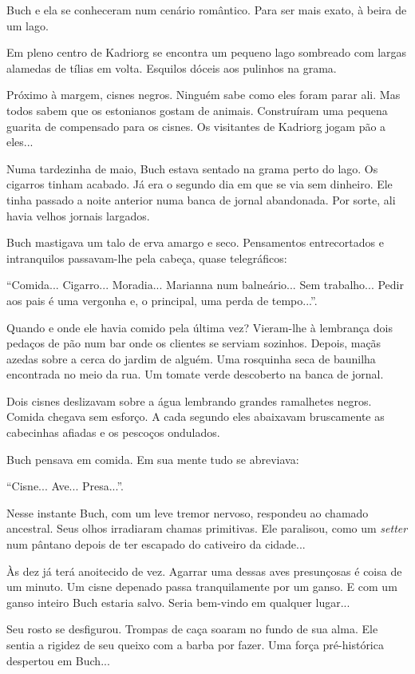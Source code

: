 Buch e ela se conheceram num cenário romântico. Para ser mais exato, à
beira de um lago.

Em pleno centro de Kadriorg se encontra um pequeno lago sombreado com
largas alamedas de tílias em volta. Esquilos dóceis aos pulinhos na
grama.

Próximo à margem, cisnes negros. Ninguém sabe como eles foram parar ali.
Mas todos sabem que os estonianos gostam de animais. Construíram uma
pequena guarita de compensado para os cisnes. Os visitantes de Kadriorg
jogam pão a eles...

Numa tardezinha de maio, Buch estava sentado na grama perto do lago. Os
cigarros tinham acabado. Já era o segundo dia em que se via sem
dinheiro. Ele tinha passado a noite anterior numa banca de jornal
abandonada. Por sorte, ali havia velhos jornais largados.

Buch mastigava um talo de erva amargo e seco. Pensamentos entrecortados
e intranquilos passavam-lhe pela cabeça, quase telegráficos:

``Comida... Cigarro... Moradia... Marianna num balneário... Sem
trabalho... Pedir aos pais é uma vergonha e, o principal, uma perda de
tempo...''.

Quando e onde ele havia comido pela última vez? Vieram-lhe à lembrança
dois pedaços de pão num bar onde os clientes se serviam sozinhos.
Depois, maçãs azedas sobre a cerca do jardim de alguém. Uma rosquinha
seca de baunilha encontrada no meio da rua. Um tomate verde descoberto
na banca de jornal.

Dois cisnes deslizavam sobre a água lembrando grandes ramalhetes negros.
Comida chegava sem esforço. A cada segundo eles abaixavam bruscamente as
cabecinhas afiadas e os pescoços ondulados.

Buch pensava em comida. Em sua mente tudo se abreviava:

``Cisne... Ave... Presa...''.

Nesse instante Buch, com um leve tremor nervoso, respondeu ao chamado
ancestral. Seus olhos irradiaram chamas primitivas. Ele paralisou, como
um \emph{setter} num pântano depois de ter escapado do cativeiro da
cidade...

Às dez já terá anoitecido de vez. Agarrar uma dessas aves presunçosas é
coisa de um minuto. Um cisne depenado passa tranquilamente por um ganso.
E com um ganso inteiro Buch estaria salvo. Seria bem-vindo em qualquer
lugar...

Seu rosto se desfigurou. Trompas de caça soaram no fundo de sua alma.
Ele sentia a rigidez de seu queixo com a barba por fazer. Uma força
pré-histórica despertou em Buch...

